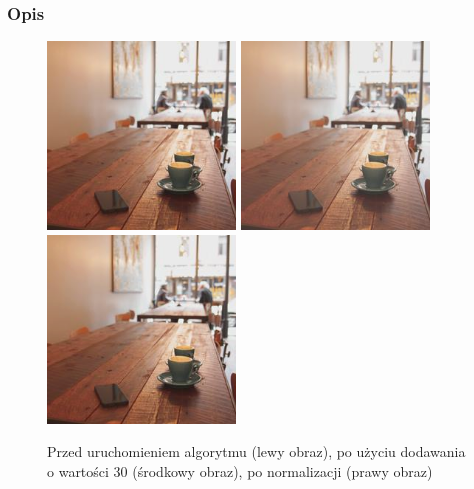 \documentclass[a4paper,12pt]{book}
\begin{document}
\subsubsection*{Opis}
\begin{figure}[H]
	\caption{Przed uruchomieniem algorytmu (lewy obraz), po użyciu dodawania o wartości 30 (środkowy obraz), po normalizacji (prawy obraz)}
	\includegraphics[width=5cm, height=5cm]{coffee-unmodified.jpg}
	\includegraphics[width=5cm, height=5cm]{3-1/sum-color-const-coffee-30.png}
	\includegraphics[width=5cm, height=5cm]{3-1/sum-color-const-coffee-30-norm.png}
\end{figure}
\end{document}
